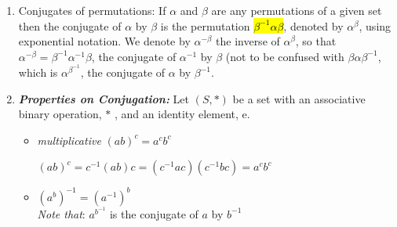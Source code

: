 \documentclass{article}
\begin{document}
\begin{enumerate}
    \newpage

    \item Conjugates of permutations: If $\alpha$ and $\beta$ are any permutations of a given set then the conjugate of $\alpha$ by $\beta$ is the permutation \hl{$\beta^{-1} \alpha \beta$}, denoted by $\alpha^{\beta}$, using exponential notation. We denote by $\alpha^{-\beta}$ the inverse of $\alpha^{\beta}$, so that $\alpha^{-\beta}=\beta^{-1} \alpha^{-1} \beta$, the conjugate of $\alpha^{-1}$ by $\beta$ (not to be confused with $\beta \alpha \beta^{-1}$, which is $\alpha^{\beta^{-1}}$, the conjugate of $\alpha$ by $\beta^{-1}$.
    \item \textbf{\textit{Properties on Conjugation:}}
            Let $(S,*)$ be a set with an associative binary operation, $*$ , and an identity element, e.
            \begin{itemize}
                \item \textit{multiplicative} $(ab)^c = a^{c}b^{c}$
                \begin{center}
                    $(ab)^c = c^{-1} (a b) c = (c^{-1} a c) (c^{-1} b c) = a^{c}b^{c}$
                \end{center}

                \item $(a^b)^{-1} = (a^{-1})^{b}$ \\
                \textit{Note that}: $a^{b^{-1}}$ is the conjugate of $a$ by $b^{-1}$ 
            \end{itemize}


\end{enumerate}
\end{document}
